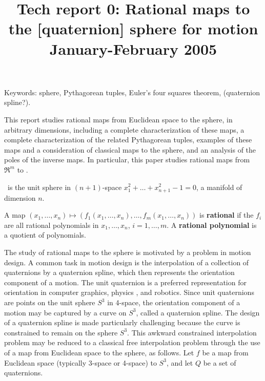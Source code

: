 \documentclass[11pt]{article}
\title{Tech report 0: Rational maps to the [quaternion] sphere for motion\\January-February 2005}
\begin{document}
\maketitle

Keywords: sphere, Pythagorean tuples, Euler's four squares theorem, (quaternion spline?).

This report studies rational maps from Euclidean space to the sphere,
in arbitrary dimensions,
including a complete %
characterization of these maps, a complete characterization of the 
related Pythagorean tuples, examples of these maps and a consideration
of classical maps to the sphere, 
and an analysis of the
poles of the inverse maps.
%
In particular, this paper studies rational maps from $\Re^m$ to .

\begin{defn2}
\ is the unit sphere in $(n+1)$-space $x_1^2 + \ldots + x_{n+1}^2 - 1 = 0$,
a manifold of dimension $n$.
\end{defn2}

\begin{defn2}
A map $(x_1,\ldots,x_n) \mapsto (f_1 (x_1,\ldots,x_n),\ldots,f_m (x_1,\ldots,x_n))$
is {\bf rational} if 
the $f_i$ are all rational polynomials in $x_1,\ldots,x_n$, $i=1,\ldots,m$.
A {\bf rational polynomial} is a quotient of polynomials.
\end{defn2}

The study of rational maps to the sphere is motivated by a problem in motion design.
A common task in motion design is the interpolation of a collection of quaternions
by a quaternion spline, which then represents the orientation component of a motion.
The unit quaternion is a preferred representation for orientation
in computer graphics, physics \cite{misner}, and robotics.
Since unit quaternions are points on the unit sphere $S^3$ in 4-space, 
the orientation component of a motion may be captured by a curve on $S^3$, called
a quaternion spline.
The design of a quaternion spline is made particularly challenging because 
the curve is constrained to remain on the sphere $S^3$.
This awkward constrained interpolation problem may be reduced to 
a classical free interpolation problem through the use of a map from Euclidean space 
to the sphere, as follows.
Let $f$ be a map from Euclidean space (typically 3-space or 4-space) to $S^3$,
and let $Q$ be a set of quaternions.
\end{document}
